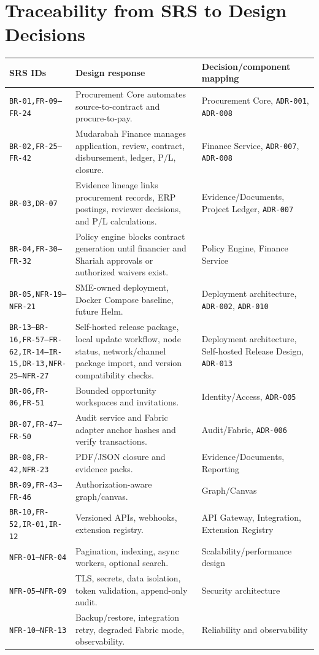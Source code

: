 \documentclass[11pt,a4paper]{article}
\newcommand{\req}[1]{\texttt{#1}}
\newcommand{\adr}[1]{\texttt{ADR-#1}}
\begin{document}
\appendix
\section{Traceability from SRS to Design Decisions}
\begin{longtable}{L{32mm}L{55mm}L{49mm}}
\toprule
\textbf{SRS IDs} & \textbf{Design response} & \textbf{Decision/component mapping} \\
\midrule
\req{BR-01,FR-09--FR-24} & Procurement Core automates source-to-contract and procure-to-pay. & Procurement Core, \adr{001}, \adr{008} \\
\req{BR-02,FR-25--FR-42} & Mudarabah Finance manages application, review, contract, disbursement, ledger, P/L, closure. & Finance Service, \adr{007}, \adr{008} \\
\req{BR-03,DR-07} & Evidence lineage links procurement records, ERP postings, reviewer decisions, and P/L calculations. & Evidence/Documents, Project Ledger, \adr{007} \\
\req{BR-04,FR-30--FR-32} & Policy engine blocks contract generation until financier and Shariah approvals or authorized waivers exist. & Policy Engine, Finance Service \\
\req{BR-05,NFR-19--NFR-21} & SME-owned deployment, Docker Compose baseline, future Helm. & Deployment architecture, \adr{002}, \adr{010} \\
\req{BR-13--BR-16,FR-57--FR-62,IR-14--IR-15,DR-13,NFR-25--NFR-27} & Self-hosted release package, local update workflow, node status, network/channel package import, and version compatibility checks. & Deployment architecture, Self-hosted Release Design, \adr{013} \\
\req{BR-06,FR-06,FR-51} & Bounded opportunity workspaces and invitations. & Identity/Access, \adr{005} \\
\req{BR-07,FR-47--FR-50} & Audit service and Fabric adapter anchor hashes and verify transactions. & Audit/Fabric, \adr{006} \\
\req{BR-08,FR-42,NFR-23} & PDF/JSON closure and evidence packs. & Evidence/Documents, Reporting \\
\req{BR-09,FR-43--FR-46} & Authorization-aware graph/canvas. & Graph/Canvas \\
\req{BR-10,FR-52,IR-01,IR-12} & Versioned APIs, webhooks, extension registry. & API Gateway, Integration, Extension Registry \\
\req{NFR-01--NFR-04} & Pagination, indexing, async workers, optional search. & Scalability/performance design \\
\req{NFR-05--NFR-09} & TLS, secrets, data isolation, token validation, append-only audit. & Security architecture \\
\req{NFR-10--NFR-13} & Backup/restore, integration retry, degraded Fabric mode, observability. & Reliability and observability \\
\bottomrule
\end{longtable}
\end{document}
